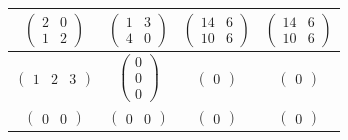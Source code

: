 \documentclass[a4paper, 12pt]{extreport}
\begin{document}
\begin{table}[h]
\begin{center}
\begin{threeparttable}
\begin{tabular}{|c|c|c|c|}
                $\begin{pmatrix}
                    2 & 0 \\
                    1 & 2
                \end{pmatrix}$ & 
                $\begin{pmatrix}
                    1 & 3 \\
                    4 & 0
                \end{pmatrix}$ & 
                $\begin{pmatrix}
                    14 & 6 \\
                    10 & 6
                \end{pmatrix}$ & 
                $\begin{pmatrix}
                    14 & 6 \\
                    10 & 6
                \end{pmatrix}$ \\ \hline
                
                $\begin{pmatrix}
                    1 & 2 & 3
                \end{pmatrix}$ & 
                $\begin{pmatrix}
                    0 \\
                    0 \\
                    0
                \end{pmatrix}$ & 
                $\begin{pmatrix}
                    0
                \end{pmatrix}$ & 
                $\begin{pmatrix}
                    0
                \end{pmatrix}$ \\ \hline
                
                $\begin{pmatrix}
                    0 & 0
                \end{pmatrix}$ & 
                $\begin{pmatrix}
                    0 & 0
                \end{pmatrix}$ & 
                $\begin{pmatrix}
                    0
                \end{pmatrix}$ & 
                $\begin{pmatrix}
                    0
                \end{pmatrix}$ \\ \hline
                

\end{tabular}
\end{threeparttable}
\end{center}
\end{table}
\end{document}

